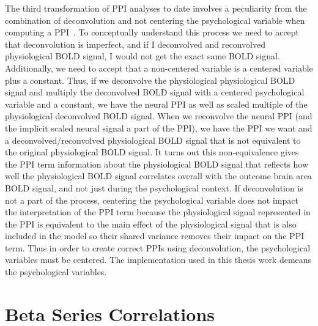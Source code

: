 \documentclass[phd,figures,tables,ackpage,abstractpage,publicabstractpage]{uithesis}
\begin{document}
The third transformation of PPI analyses to date involves a peculiarity from the combination of
deconvolution and not centering the psychological variable when computing a PPI~\cite{Di2017}.
To conceptually understand this process we need to accept that deconvolution is imperfect, and if I
deconvolved and reconvolved physiological BOLD signal, I would not get the exact same BOLD signal.
Additionally, we need to accept that a non-centered variable is a centered variable plus a constant.
Thus, if we deconvolve the physiological physiological BOLD signal and multiply the deconvolved
BOLD signal with a centered psychological variable and a constant, we have the neural PPI
as well as scaled multiple of the physiological deconvolved BOLD signal.
When we reconvolve the neural PPI (and the implicit scaled neural signal a part of the PPI),
we have the PPI we want and a deconvolved/reconvolved physiological BOLD signal that is not equivalent to the
original physiological BOLD signal.
It turns out this non-equivalence gives the PPI term information about the physiological BOLD signal that
reflects how well the physiological BOLD signal correlates overall with the outcome brain area BOLD signal, and not just
during the psychological context.
If deconvolution is not a part of the process, centering the psychological variable does not impact the interpretation
of the PPI term because the physiological signal represented in the PPI is equivalent to the main effect of the physiological
signal that is also included in the model so their shared variance removes their impact on the PPI term.
Thus in order to create correct PPIs using deconvolution, the psychological variables must be centered.
The implementation used in this thesis work demeans the psychological variables.

\section{Beta Series Correlations}
\end{document}
